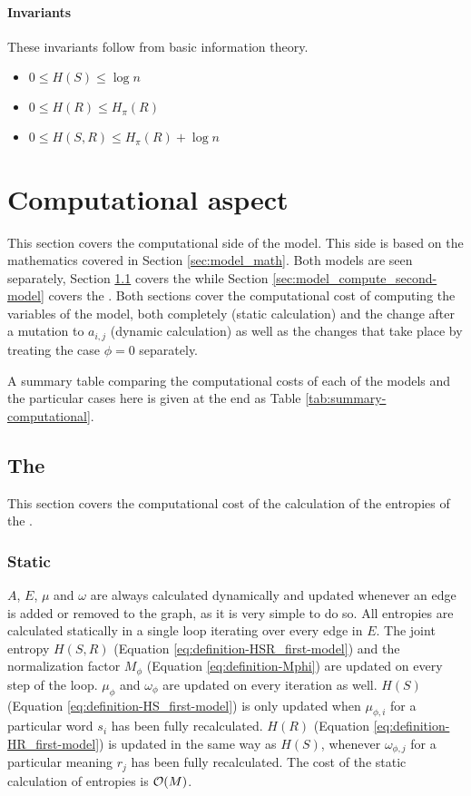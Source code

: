 \paragraph{Invariants} These invariants follow from basic information theory.
\cite{Cover1999}

\begin{itemize}
\item $0 \leq H(S) \leq \log n$
\item $0 \leq H(R) \leq H_\pi(R)$
\item $0 \leq H(S,R) \leq H_\pi(R) + \log n$
\end{itemize}

\section{Computational aspect}
\label{sec:model_compute}

This section covers the computational side of the model.
This side is based on the mathematics covered in Section \ref{sec:model_math}.
Both models are seen separately, Section \ref{sec:model_compute_first-model} covers the \firstmodel{} while Section \ref{sec:model_compute_second-model} covers the \secondmodel{}.
Both sections cover the computational cost of computing the variables of the model, both completely (static calculation) and the change after a mutation to $a_{i,j}$ (dynamic calculation) as well as the changes that take place by treating the case $\phi=0$ separately.

A summary table comparing the computational costs of each of the models and the particular cases here is given at the end as Table \ref{tab:summary-computational}.

\subsection{The \firstmodel{}}
\label{sec:model_compute_first-model}

This section covers the computational cost of the calculation of the entropies of the \firstmodel{}.

\subsubsection{Static}

$A$, $E$, $\mu$ and $\omega$ are always calculated dynamically and updated whenever an edge is added or removed to the graph, as it is very simple to do so.
All entropies are calculated statically in a single loop iterating over every edge in $E$.
The joint entropy $H(S,R)$ (Equation \eqref{eq:definition-HSR_first-model}) and the normalization factor $M_\phi$ (Equation \eqref{eq:definition-Mphi}) are updated on every step of the loop.
$\mu_\phi$ and $\omega_\phi$ are updated on every iteration as well.
$H(S)$ (Equation \eqref{eq:definition-HS_first-model}) is only updated when $\mu_{\phi,i}$ for a particular word $s_i$ has been fully recalculated.
$H(R)$ (Equation \eqref{eq:definition-HR_first-model}) is updated in the same way as $H(S)$, whenever $\omega_{\phi,j}$ for a particular meaning $r_j$ has been fully recalculated.
The cost of the static calculation of entropies is $\mathcal{O}(M)$.

